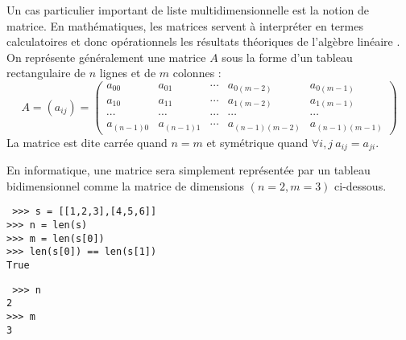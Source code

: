 Un cas particulier important de liste multidimensionnelle est la notion de matrice.
En mathématiques, les matrices servent à interpréter en termes calculatoires et 
donc opéra\-tion\-nels les résultats théoriques de l'algèbre linéaire \cite{florent77}\label{cite:florent1}.
On représente généralement une matrice $A$ sous la forme d'un tableau rectangulaire
de $n$ lignes et de $m$ colonnes :
$$ A = \left(a_{ij}\right) = 
\left(
\begin{array}{rrrrr}
a_{00}     & a_{01}     & \cdots & a_{0(m-2)} & a_{0(m-1)} \\
a_{10}     & a_{11}     & \cdots & a_{1(m-2)} & a_{1(m-1)} \\
\cdots     & \cdots     & \cdots & \cdots     & \cdots \\
a_{(n-1)0} & a_{(n-1)1} & \cdots & a_{(n-1)(m-2)} & a_{(n-1)(m-1)} 
\end{array}
\right)
$$
La matrice est dite carrée quand $n=m$ et symétrique quand 
$\forall i,j\ a_{ij} = a_{ji}$.

En informatique, une matrice sera simplement représentée par un tableau bidimensionnel
comme la matrice de dimensions $(n=2,m=3)$ ci-dessous.

\noindent\mbox{}\hspace*{1cm}\begin{py}{9cm}\tt
>>> s = [[1,2,3],[4,5,6]]\\
>>> n = len(s)\\
>>> m = len(s[0])\\
>>> len(s[0]) == len(s[1])\\
True
\end{py}
\hfill
\begin{py}{6cm}\tt
>>> n\\
2\\
>>> m\\
3
\end{py}
\vspace*{2mm}


